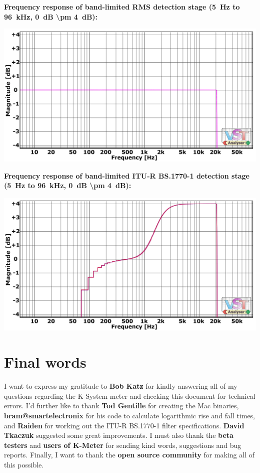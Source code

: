 \newpage %

\textbf{Frequency response of band-limited RMS detection stage
  (\SI{5}{\hertz} to \SI{96}{\kilo\hertz}, \SI{0}{\dB} \SI{\pm
    4}{\dB}):}

\begin{center}
  \includegraphics[scale=0.60,clip]{include/images/fft_192khz-freq_zoomed-rms.png}
\end{center}

\textbf{Frequency response of band-limited ITU-R BS.1770-1 detection stage
  (\SI{5}{\hertz} to \SI{96}{\kilo\hertz}, \SI{0}{\dB} \SI{\pm
    4}{\dB}):}

\begin{center}
  \includegraphics[scale=0.60,clip]{include/images/fft_192khz-freq_zoomed-itu_r.png}
\end{center}

\chapter{Final words}
\label{chap:final_words}

I want to express my gratitude to \textbf{Bob Katz} for kindly
answering all of my questions regarding the K-System meter and
checking this document for technical errors.  I'd further like to
thank \textbf{Tod Gentille} for creating the Mac binaries,
\textbf{bram@smartelectronix} for his code to calculate logarithmic
rise and fall times, and \textbf{Raiden} for working out the ITU-R
BS.1770-1 filter specifications.  \textbf{David Tkaczuk} suggested
some great improvements.  I must also thank the \textbf{beta testers}
and \textbf{users of K-Meter} for sending kind words, suggestions and
bug reports.  Finally, I want to thank the \textbf{open source
  community} for making all of this possible.

